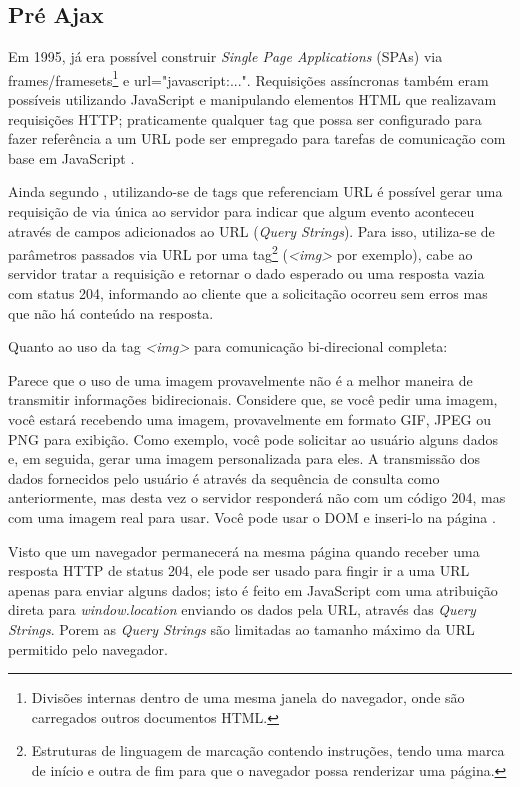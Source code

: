 \subsection{Pré Ajax}

Em 1995, já era possível construir \emph{Single Page Applications} (SPAs) via frames/framesets\footnote{Divisões internas dentro de uma mesma janela do navegador, onde são carregados outros documentos HTML.} e url="javascript:...". Requisições assíncronas também eram possíveis utilizando JavaScript e manipulando elementos HTML que realizavam requisições HTTP; praticamente qualquer tag que possa ser configurado para fazer referência a um URL pode ser empregado para tarefas de comunicação com base em JavaScript \cite{powell2008ajax}.

Ainda segundo , utilizando-se de tags que referenciam URL é possível gerar uma requisição de via única ao servidor para indicar que algum evento aconteceu através de campos adicionados ao URL (\emph{Query Strings}). Para isso, utiliza-se de parâmetros passados via URL por uma tag\footnote{Estruturas de linguagem de marcação contendo instruções, tendo uma marca de início e outra de fim para que o navegador possa renderizar uma página.} (\emph{<img>} por exemplo), cabe ao servidor tratar a requisição e retornar o dado esperado ou uma resposta vazia com status 204, informando ao cliente que a solicitação ocorreu sem erros mas que não há conteúdo na resposta.

Quanto ao uso da tag \emph{<img>} para comunicação bi-direcional  completa:

\begin{citacao}
	Parece que o uso de uma imagem provavelmente não é a melhor maneira de transmitir informações bidirecionais. Considere que, se você pedir uma imagem, você estará recebendo uma imagem, provavelmente em formato GIF, JPEG ou PNG para exibição. Como exemplo, você pode solicitar ao usuário alguns dados e, em seguida, gerar uma imagem personalizada para eles. A transmissão dos dados fornecidos pelo usuário é através da sequência de consulta como anteriormente, mas desta vez o servidor responderá não com um código 204, mas com uma imagem real para usar. Você pode usar o DOM e inseri-lo na página \cite[P.~32]{powell2008ajax}.
\end{citacao}

Visto que um navegador permanecerá na mesma página quando receber uma resposta HTTP de status 204, ele pode ser usado para fingir ir a uma URL apenas para enviar alguns dados; isto é feito em JavaScript com uma atribuição direta para \emph{window.location} enviando os dados pela URL, através das \emph{Query Strings}. Porem as \emph{Query Strings} são limitadas ao tamanho máximo da URL permitido pelo navegador.


